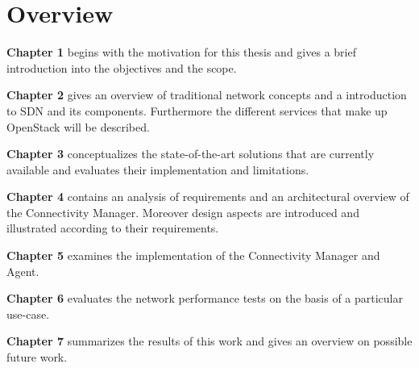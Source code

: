 \section{Overview}

\textbf{Chapter 1} begins with the motivation for this thesis and gives a brief introduction into the objectives and the scope.

\textbf{Chapter 2} gives an overview of traditional network concepts and a introduction to SDN and its components. Furthermore the different services that make up OpenStack will be described.

\textbf{Chapter 3} conceptualizes the state-of-the-art solutions that are currently available and evaluates their implementation and limitations.

\textbf{Chapter 4} contains an analysis of requirements and an architectural overview of the Connectivity Manager. Moreover design aspects are introduced and illustrated according to their requirements.

\textbf{Chapter 5} examines the implementation of the Connectivity Manager and Agent.

\textbf{Chapter 6} evaluates the network performance tests on the basis of a particular use-case.

\textbf{Chapter 7} summarizes the results of this work and gives an overview on possible future work.


